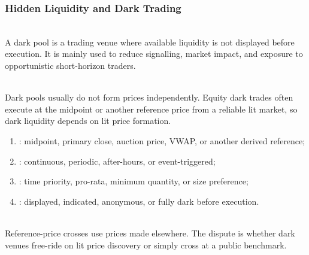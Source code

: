 \subsubsection{Hidden Liquidity and Dark Trading}

\begin{definition} \\
A dark pool is a trading venue where available liquidity is not displayed before execution. It is mainly used to reduce signalling, market impact, and exposure to opportunistic short-horizon traders.
\end{definition}

\begin{principle} \\
Dark pools usually do not form prices independently. Equity dark trades often execute at the midpoint or another reference price from a reliable lit market, so dark liquidity depends on lit price formation.
\end{principle}

\begin{taxonomy} 
\begin{enumerate}[label=\roman*.]
\setlength{\itemsep}{0pt}
\item {}: midpoint, primary close, auction price, VWAP, or another derived reference;
\item {}: continuous, periodic, after-hours, or event-triggered;
\item {}: time priority, pro-rata, minimum quantity, or size preference;
\item {}: displayed, indicated, anonymous, or fully dark before execution.
\end{enumerate}
\end{taxonomy}

\begin{principle} \\
Reference-price crosses use prices made elsewhere. The dispute is whether dark venues free-ride on lit price discovery or simply cross at a public benchmark.
\end{principle}

